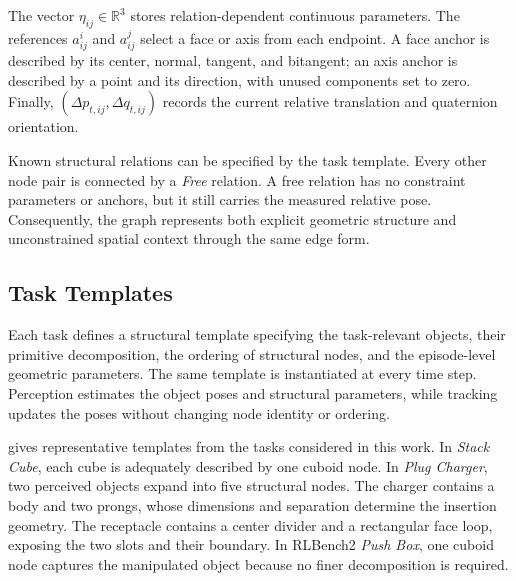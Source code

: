 The vector $\eta_{ij}\in\mathbb{R}^{3}$ stores relation-dependent continuous
parameters. The references $a_{ij}^{i}$ and $a_{ij}^{j}$ select a face or axis
from each endpoint. A face anchor is described by its center, normal, tangent,
and bitangent; an axis anchor is described by a point and its direction, with
unused components set to zero. Finally,
$(\Delta p_{t,ij},\Delta q_{t,ij})$ records the current relative translation
and quaternion orientation.

Known structural relations can be specified by the task template. Every other
node pair is connected by a \textit{Free} relation. A free relation has no
constraint parameters or anchors, but it still carries the measured relative
pose. Consequently, the graph represents both explicit geometric structure
and unconstrained spatial context through the same edge form.

\subsection{Task Templates}
\label{app:ost_map_templates}

Each task defines a structural template specifying the task-relevant objects,
their primitive decomposition, the ordering of structural nodes, and the
episode-level geometric parameters. The same template is instantiated at
every time step. Perception estimates the object poses and structural
parameters, while tracking updates the poses without changing node identity or
ordering.

 gives representative templates from the
tasks considered in this work. In \textit{Stack Cube}, each cube is adequately
described by one cuboid node. In \textit{Plug Charger}, two perceived objects
expand into five structural nodes. The charger contains a body and two prongs,
whose dimensions and separation determine the insertion geometry. The
receptacle contains a center divider and a rectangular face loop, exposing the
two slots and their boundary. In RLBench2 \textit{Push Box}, one cuboid node
captures the manipulated object because no finer decomposition is required.

